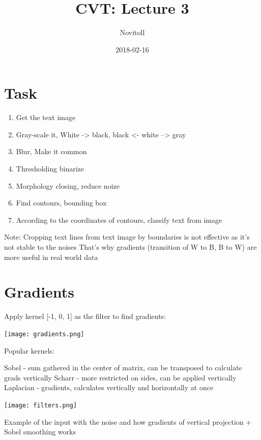 \documentclass[11pt]{article}
\title{CVT: Lecture 3}
\date{2018-02-16}
\author{Novitoll}
\begin{document}
    \maketitle

    \section{Task}
    \begin{enumerate}
        \item Get the text image
        \item Gray-scale it, White -> black, black <- white --> gray
        \item Blur, Make it common
        \item Thresholding binarize
        \item Morphology closing, reduce noize
        \item Find contours, bounding box
        \item According to the coordinates of contours, classify text from image
    \end{enumerate}

    Note: Cropping text lines from text image by boundaries is not effective as it's not stable to the noises
    That's why gradients (transition of W to B, B to W) are more useful in real world data

    \section{Gradients}

    Apply kernel [-1, 0, 1]  as the filter to find gradients:

    \texttt{[image: gradients.png]}

    Popular kernels:

    Sobel - sum gathered in the center of matrix, can be transposed to calculate grads vertically
    Scharr - more restricted on sides, can be applied vertically
    Laplacian - gradients, calculates vertically and horizontally at once

    \texttt{[image: filters.png]}

    Example of the input with the noise and how gradients of vertical projection + Sobel smoothing works
\end{document}
